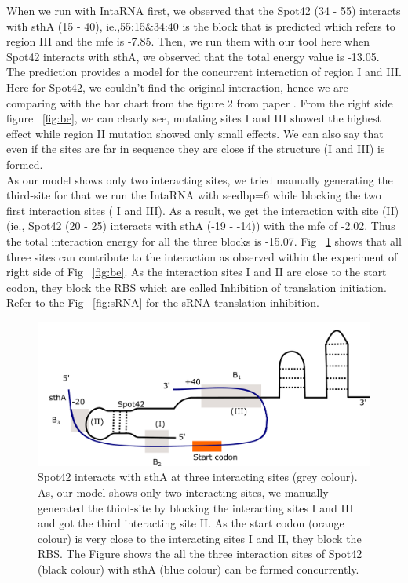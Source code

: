 \documentclass[twoside,a4paper]{report}
\numberwithin{equation}{section}
\begin{document}
When we run with IntaRNA first, we observed that the Spot42 (34 - 55) interacts with sthA (15 - 40), ie.,55:15\&34:40 is the block that is predicted which refers to region III and the mfe is -7.85. Then, we run them with our tool here when Spot42 interacts with sthA, we observed that the total energy value is -13.05. The prediction provides a model for the concurrent interaction of region I and III.  Here for Spot42, we couldn't find the original interaction, hence we are comparing with the bar chart from the figure 2 from paper {\citep{beisel2011base}}. From the right side figure ~\ref{fig:be}, we can clearly see, mutating sites I and III showed the highest effect while region II mutation showed only small effects. We can also say that even if the sites are far in sequence they are close if the structure (I and III) is formed.\\

As our model shows only two interacting sites, we tried manually generating the third-site for that we run the IntaRNA with seedbp=6 while blocking the two first interaction sites ( I and III). As a result, we get the interaction with site (II) (ie., Spot42 (20 - 25) interacts with sthA (-19 - -14)) with the mfe of -2.02. Thus the total interaction energy for all the three blocks is -15.07.  Fig ~\ref{fig:thirdsite} shows that all three sites can contribute to the interaction as observed within the experiment of right side of Fig ~\ref{fig:be}. As the interaction sites I and II are close to the start codon, they block the RBS which are called Inhibition of translation initiation. Refer to the Fig ~\ref{fig:sRNA} for the sRNA translation inhibition. \\



	\begin{figure}[h!tb]
	\includegraphics[width=0.85\linewidth]{thirdsite.pdf}
	\centering
	\caption{ Spot42 interacts with sthA at three interacting sites (grey colour). As, our model shows only two interacting sites, we manually generated the third-site by blocking the interacting sites I and III and got the third interacting site II. As the start codon (orange colour) is very close to the interacting sites I and II, they block the RBS. The Figure shows the all the three interaction sites of Spot42 (black colour) with sthA (blue colour) can be formed concurrently.  } 
	\label{fig:thirdsite}
\end{figure}
\end{document}
